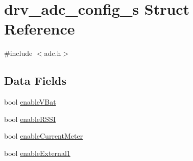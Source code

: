 \hypertarget{structdrv__adc__config__s}{\section{drv\+\_\+adc\+\_\+config\+\_\+s Struct Reference}
\label{structdrv__adc__config__s}
}


{\ttfamily \#include $<$adc.\+h$>$}

\subsection*{Data Fields}
\begin{DoxyCompactItemize}
\item 
bool \hyperlink{structdrv__adc__config__s_aa32839c2e87077e7928b0bfa4961d3f3}{enable\+V\+Bat}
\item 
bool \hyperlink{structdrv__adc__config__s_a123f313124921d579dc5b5b74938e2aa}{enable\+R\+S\+S\+I}
\item 
bool \hyperlink{structdrv__adc__config__s_a600480aceaa0b39d562f9f819d3d30d5}{enable\+Current\+Meter}
\item 
bool \hyperlink{structdrv__adc__config__s_a2af61b86debe9eac8d06ec4b5e5cd38a}{enable\+External1}
\end{DoxyCompactItemize}


